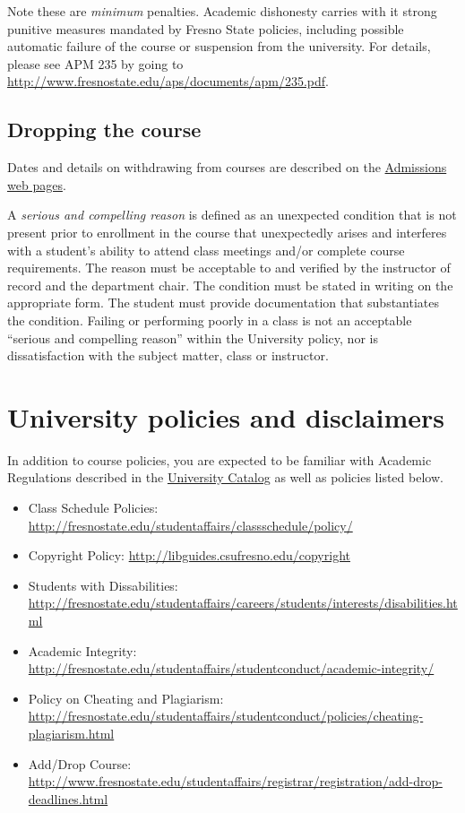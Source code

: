 Note these are \emph{minimum} penalties. Academic dishonesty carries
with it strong punitive measures mandated by Fresno State policies,
including possible automatic failure of the course or suspension from
the university. For details, please see APM 235 by going to
\url{http://www.fresnostate.edu/aps/documents/apm/235.pdf}.

\hypertarget{dropping-the-course}{%
\subsection{Dropping the course}\label{dropping-the-course}}

Dates and details on withdrawing from courses are described on the
\href{http://fresnostate.edu/studentaffairs/are/registration/add-drop-deadlines.html}{Admissions
web pages}.

A \emph{serious and compelling reason} is defined as an unexpected
condition that is not present prior to enrollment in the course that
unexpectedly arises and interferes with a student's ability to attend
class meetings and/or complete course requirements. The reason must be
acceptable to and verified by the instructor of record and the
department chair. The condition must be stated in writing on the
appropriate form. The student must provide documentation that
substantiates the condition. Failing or performing poorly in a class is
not an acceptable ``serious and compelling reason'' within the
University policy, nor is dissatisfaction with the subject matter, class
or instructor.

\hypertarget{university-policies-and-disclaimers}{%
\section{University policies and
disclaimers}\label{university-policies-and-disclaimers}}

In addition to course policies, you are expected to be familiar with
Academic Regulations described in the
\href{http://www.fresnostate.edu/catalog/academic-regulations/}{University
Catalog} as well as policies listed below.

\begin{itemize}
\tightlist
\item
  Class Schedule Policies:
  \url{http://fresnostate.edu/studentaffairs/classschedule/policy/}
\item
  Copyright Policy: \url{http://libguides.csufresno.edu/copyright}
\item
  Students with Dissabilities:
  \url{http://fresnostate.edu/studentaffairs/careers/students/interests/disabilities.html}
\item
  Academic Integrity:
  \url{http://fresnostate.edu/studentaffairs/studentconduct/academic-integrity/}
\item
  Policy on Cheating and Plagiarism:
  \url{http://fresnostate.edu/studentaffairs/studentconduct/policies/cheating-plagiarism.html}
\item
  Add/Drop Course:
  \href{http://fresnostate.edu/studentaffairs/classschedule/registration/add-drop.html}{http://www.fresnostate.edu/studentaffairs/registrar/registration/add-drop-deadlines.html}
\end{itemize}

